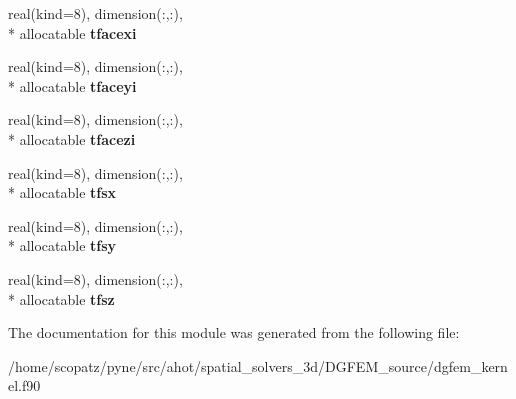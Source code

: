 \begin{DoxyCompactItemize}
\item 
\hypertarget{classdgfem__kernel__module_af42dd3f4f583d8432912c15f2a5cf3dd}{real(kind=8), dimension(\-:,\-:), \\*
allocatable {\bfseries tfacexi}}\label{classdgfem__kernel__module_af42dd3f4f583d8432912c15f2a5cf3dd}

\item 
\hypertarget{classdgfem__kernel__module_a68ae2f84e123935b49b31f7919328a05}{real(kind=8), dimension(\-:,\-:), \\*
allocatable {\bfseries tfaceyi}}\label{classdgfem__kernel__module_a68ae2f84e123935b49b31f7919328a05}

\item 
\hypertarget{classdgfem__kernel__module_aba37bea00bccf7932a71e8373227a826}{real(kind=8), dimension(\-:,\-:), \\*
allocatable {\bfseries tfacezi}}\label{classdgfem__kernel__module_aba37bea00bccf7932a71e8373227a826}

\item 
\hypertarget{classdgfem__kernel__module_a241926bb840141b2c22f1a70d8c337af}{real(kind=8), dimension(\-:,\-:), \\*
allocatable {\bfseries tfsx}}\label{classdgfem__kernel__module_a241926bb840141b2c22f1a70d8c337af}

\item 
\hypertarget{classdgfem__kernel__module_a92037d1eb02c4c4ba55ecfbb1577fa32}{real(kind=8), dimension(\-:,\-:), \\*
allocatable {\bfseries tfsy}}\label{classdgfem__kernel__module_a92037d1eb02c4c4ba55ecfbb1577fa32}

\item 
\hypertarget{classdgfem__kernel__module_ae9e5a881069ba9b29b234b4e39d5688c}{real(kind=8), dimension(\-:,\-:), \\*
allocatable {\bfseries tfsz}}\label{classdgfem__kernel__module_ae9e5a881069ba9b29b234b4e39d5688c}

\end{DoxyCompactItemize}


The documentation for this module was generated from the following file\-:\begin{DoxyCompactItemize}
\item 
/home/scopatz/pyne/src/ahot/spatial\-\_\-solvers\-\_\-3d/\-D\-G\-F\-E\-M\-\_\-source/dgfem\-\_\-kernel.\-f90\end{DoxyCompactItemize}
